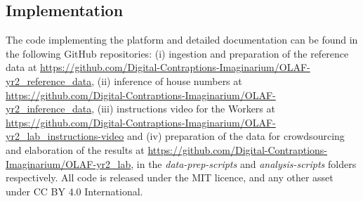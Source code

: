 \subsection{Implementation}

\begin{sloppypar} %
The code implementing the platform and detailed documentation can be found in the following GitHub repositories: (i) ingestion and preparation of the reference data at \url{https://github.com/Digital-Contraptions-Imaginarium/OLAF-yr2_reference_data}, (ii) inference of house numbers at \url{https://github.com/Digital-Contraptions-Imaginarium/OLAF-yr2_inference_data}, (iii) instructions video for the Workers at \url{https://github.com/Digital-Contraptions-Imaginarium/OLAF-yr2_lab_instructions-video} and (iv) preparation of the data for crowdsourcing and elaboration of the results at \url{https://github.com/Digital-Contraptions-Imaginarium/OLAF-yr2_lab}, in the {\it data-prep-scripts} and {\it analysis-scripts} folders respectively. All code is released under the MIT licence, and any other asset under CC BY 4.0 International.
\end{sloppypar}